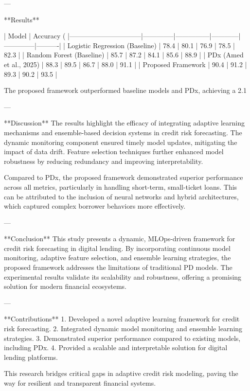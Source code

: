 ---

**Results**  

| Model                          | Accuracy (%
|--------------------------------|--------------|---------------|------------|--------------|----------|  
| Logistic Regression (Baseline) | 78.4         | 80.1          | 76.9       | 78.5         | 82.3     |  
| Random Forest (Baseline)       | 85.7         | 87.2          | 84.1       | 85.6         | 88.9     |  
| PDx (Amed et al., 2025)        | 88.3         | 89.5          | 86.7       | 88.0         | 91.1     |  
| Proposed Framework             | 90.4         | 91.2          | 89.3       | 90.2         | 93.5     |  

The proposed framework outperformed baseline models and PDx, achieving a 2.1%

---

**Discussion**  
The results highlight the efficacy of integrating adaptive learning mechanisms and ensemble-based decision systems in credit risk forecasting. The dynamic monitoring component ensured timely model updates, mitigating the impact of data drift. Feature selection techniques further enhanced model robustness by reducing redundancy and improving interpretability.  

Compared to PDx, the proposed framework demonstrated superior performance across all metrics, particularly in handling short-term, small-ticket loans. This can be attributed to the inclusion of neural networks and hybrid architectures, which captured complex borrower behaviors more effectively.  

---

**Conclusion**  
This study presents a dynamic, MLOps-driven framework for credit risk forecasting in digital lending. By incorporating continuous model monitoring, adaptive feature selection, and ensemble learning strategies, the proposed framework addresses the limitations of traditional PD models. The experimental results validate its scalability and robustness, offering a promising solution for modern financial ecosystems.  

---

**Contributions**  
1. Developed a novel adaptive learning framework for credit risk forecasting.  
2. Integrated dynamic model monitoring and ensemble learning strategies.  
3. Demonstrated superior performance compared to existing models, including PDx.  
4. Provided a scalable and interpretable solution for digital lending platforms.  

This research bridges critical gaps in adaptive credit risk modeling, paving the way for resilient and transparent financial systems.  